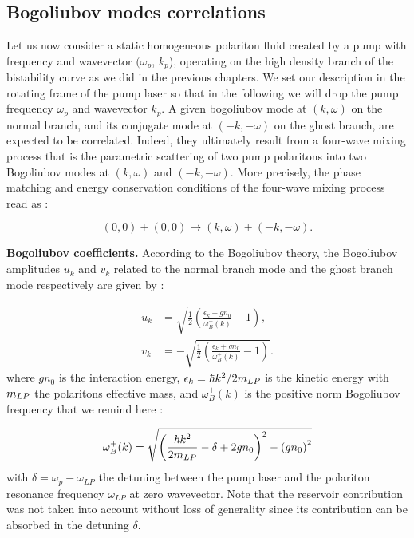 \subsection{Bogoliubov modes correlations}

Let us now consider a static homogeneous polariton fluid created by a pump with frequency and wavevector $(\omega_p$, $k_p$), operating on the high density branch of the bistability curve as we did in the previous chapters.
We set our description in the rotating frame of the pump laser so that in the following we will drop the pump frequency $\omega_p$ and wavevector $k_p$.
A given bogoliubov mode at $(k,\omega)$ on the normal branch, and its conjugate mode at $(-k,-\omega)$ on the ghost branch, are expected to be correlated.
Indeed, they ultimately result from a four-wave mixing process that is the parametric scattering of two pump polaritons into two Bogoliubov modes at $(k,\omega)$ and $(-k,-\omega)$.
More precisely, the phase matching and energy conservation conditions of the four-wave mixing process read as :

\begin{equation}
    (0,0)+(0,0) \rightarrow (k,\omega)+( -k,-\omega).
\end{equation}

\textbf{Bogoliubov coefficients.} According to the Bogoliubov theory, the Bogoliubov amplitudes $u_{k}$ and $v_{k}$ related to the normal branch mode and the ghost branch mode respectively are given by \cite{castin_bose-einstein_2001,pitaevskij_bose-einstein_2016} :

\begin{align}
    u_k &= \sqrt{\frac{1}{2} \left( \frac{\epsilon_k + g n_0}{\omega^+_B(k)} + 1 \right)}, \\
    v_k &= -\sqrt{\frac{1}{2} \left( \frac{\epsilon_k + g n_0}{\omega^+_B(k)} - 1 \right)}.
\end{align}
where $gn_0$ is the interaction energy, $\epsilon_k=\hbar k^2/2m_{LP}$ is the kinetic energy with $m_{LP}$ the polaritons effective mass, and $\omega^+_B(k)$ is the positive norm Bogoliubov frequency that we remind here :

\begin{equation}
    \omega^{+}_B(k)=\sqrt{\left(\dfrac{\hbar k^2}{2m_{LP}}-\delta +2g n_0\right)^2 - \left(g n_0\right)^2}
\end{equation}
with $\delta = \omega_p - \omega_{LP}$ the detuning between the pump laser and the polariton resonance frequency $\omega_{LP}$ at zero wavevector. Note that 
the reservoir contribution was not taken into account without loss of generality since its contribution can be absorbed in the detuning $\delta$.

